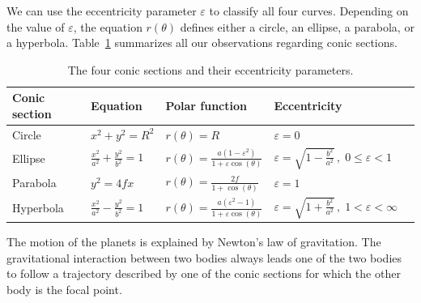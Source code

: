 		We can use the eccentricity parameter $\varepsilon$ to classify all four curves.
		Depending on the value of $\varepsilon$,
		the equation $r(\theta)$ defines either a circle, an ellipse, a parabola, or a hyperbola.	
		Table~\ref{table:conics} summarizes all our observations regarding conic sections.


		\begin{table}[htb]
		{ \small

		\centering 
		\begin{longtable}{@{}lllll@{}} 
		\toprule
		Conic section 	\! 	&  Equation  	\!\!					
		& Polar function	
		&	Eccentricity \!\!\!\!\!\!\!\!\!\!\!\!				\\
		\midrule
		Circle				& $x^2+y^2=R^2$ \; 					& $r(\theta)=R$			& $\varepsilon = 0$								\\[1mm]
		Ellipse				& $\frac{x^2}{a^2}+\frac{y^2}{b^2}=1$	& $r(\theta)=\frac{a(1-\varepsilon^2)}{1 + \varepsilon\cos(\theta)}$ &	$\varepsilon\!=\!\sqrt{1\!-\!\frac{b^2}{a^2}}\,, \; 0\!\leq\!\varepsilon\!<\!1$\!\!	\\[2mm]
		Parabola				& $y^2=4fx$						& $r(\theta)=\frac{2f}{1 + \cos(\theta)}$ &	$\varepsilon=1$			 						\\[1mm]
		Hyperbola			& $\frac{x^2}{a^2}-\frac{y^2}{b^2}=1$	& $r(\theta)=\frac{a(\varepsilon^2-1)}{1 + \varepsilon\cos(\theta)}$ &	$\varepsilon\!=\!\sqrt{1\!+\!\frac{b^2}{a^2}}\,, \; 1\!<\!\varepsilon\!<\!\infty$ \\[1mm]
		\bottomrule
		\end{longtable}

		}
		\vspace{4mm}
		\caption{The four conic sections and their eccentricity parameters. }
		\label{table:conics}
		\end{table}


		The motion of the planets is explained by Newton's law of gravitation.
		The gravitational interaction between two bodies always leads one of the two bodies to follow a trajectory described by one of the conic sections
		for which the other body is the focal point.
